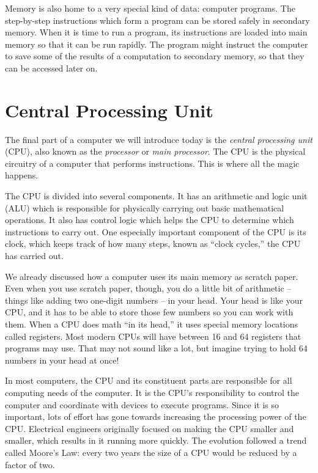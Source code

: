 Memory is also home to a very special kind of data: computer programs. The step-by-step instructions which form a program can be stored safely in secondary memory. When it is time to run a program, its instructions are loaded into main memory so that it can be run rapidly. The program might instruct the computer to save some of the results of a computation to secondary memory, so that they can be accessed later on.


\section {Central Processing Unit}

The final part of a computer we will introduce today is the \emph{central processing unit} (CPU), also known as the \emph{processor} or \emph{main processor}. The CPU is the physical circuitry of a computer that performs instructions. This is where all the magic happens.

The CPU is divided into several components. It has an arithmetic and logic unit (ALU) which is responsible for physically carrying out basic mathematical operations. It also has control logic which helps the CPU to determine which instructions to carry out. One especially important component of the CPU is its clock, which keeps track of how many steps, known as ``clock cycles,'' the CPU has carried out.

We already discussed how a computer uses its main memory as scratch paper. Even when you use scratch paper, though, you do a little bit of arithmetic -- things like adding two one-digit numbers -- in your head. Your head is like your CPU, and it has to be able to store those few numbers so you can work with them. When a CPU does math ``in its head,'' it uses special memory locations called registers. Most modern CPUs will have between 16 and 64 registers that programs may use. That may not sound like a lot, but imagine trying to hold 64 numbers in your head at once!

In most computers, the CPU and its constituent parts are responsible for all computing needs of the computer.  It is the CPU's responsibility to control the computer and coordinate with devices to execute programs. Since it is so important, lots of effort has gone towards increasing the processing power of the CPU. Electrical engineers originally focused on making the CPU smaller and smaller, which results in it running more quickly. The evolution followed a trend called Moore's Law: every two years the size of a CPU would be reduced by a factor of two.

